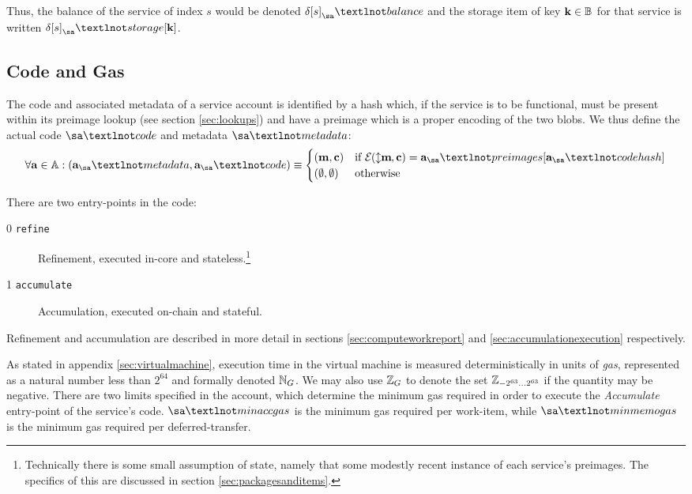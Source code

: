 Thus, the balance of the service of index $s$ would be denoted $\accounts\subb{s}_\sa¬balance$ and the storage item of key $\mathbf{k} \in \mathbb{B}_{}$ for that service is written $\accounts\subb{s}_\sa¬storage\subb{\mathbf{k}}$.








\subsection{Code and Gas}

The code and associated metadata of a service account is identified by a hash which, if the service is to be functional, must be present within its preimage lookup (see section \ref{sec:lookups}) and have a preimage which is a proper encoding of the two blobs. We thus define the actual code $\sa¬code$ and metadata $\sa¬metadata$:
\begin{align}
  \forall \mathbf{a} \in \serviceaccount : \tup{\mathbf{a}_\sa¬metadata, \mathbf{a}_\sa¬code} \equiv \begin{cases}
    \tup{\mathbf{m}, \mathbf{c}} &\when \encode{\var{\mathbf{m}}, \mathbf{c}} = \mathbf{a}_\sa¬preimages[\mathbf{a}_\sa¬codehash] \\
    \tup{\none, \none} &\otherwise
  \end{cases}
\end{align}

There are two entry-points in the code:
\begin{description}
  \item[0 \texttt{refine}]Refinement, executed in-core and stateless.\footnote{Technically there is some small assumption of state, namely that some modestly recent instance of each service's preimages. The specifics of this are discussed in section \ref{sec:packagesanditems}.}
  \item[1 \texttt{accumulate}] Accumulation, executed on-chain and stateful.
\end{description}

Refinement and accumulation are described in more detail in sections \ref{sec:computeworkreport} and \ref{sec:accumulationexecution} respectively.

As stated in appendix \ref{sec:virtualmachine}, execution time in the \Jam virtual machine is measured deterministically in units of \emph{gas}, represented as a natural number less than $2^{64}$ and formally denoted $\mathbb{N}_G$. We may also use $\mathbb{Z}_G$ to denote the set $\mathbb{Z}_{-2^{63}\dots2^{63}}$ if the quantity may be negative. There are two limits specified in the account, which determine the minimum gas required in order to execute the \emph{Accumulate} entry-point of the service's code. $\sa¬minaccgas$ is the minimum gas required per work-item, while $\sa¬minmemogas$ is the minimum gas required per deferred-transfer.










